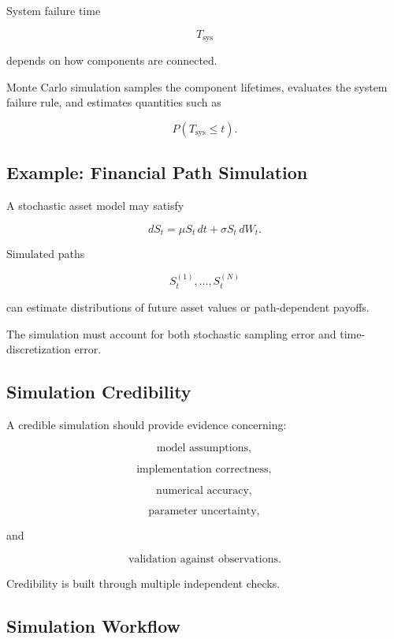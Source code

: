 System failure time

\[
T_{\mathrm{sys}}
\]

depends on how components are connected.

Monte Carlo simulation samples the component lifetimes, evaluates the
system failure rule, and estimates quantities such as

\[
\boxed{
P(T_{\mathrm{sys}}\leq t).
}
\]

\subsection{Example: Financial Path Simulation}
\label{subsec:financial-path-simulation}

A stochastic asset model may satisfy

\[
\boxed{
dS_t
=
\mu S_t\,dt
+
\sigma S_t\,dW_t.
}
\]

Simulated paths

\[
S_t^{(1)},
\ldots,
S_t^{(N)}
\]

can estimate distributions of future asset values or path-dependent
payoffs.

The simulation must account for both stochastic sampling error and
time-discretization error.

\subsection{Simulation Credibility}
\label{subsec:simulation-credibility}

A credible simulation should provide evidence concerning:

\[
\boxed{
\text{model assumptions},
}
\]

\[
\boxed{
\text{implementation correctness},
}
\]

\[
\boxed{
\text{numerical accuracy},
}
\]

\[
\boxed{
\text{parameter uncertainty},
}
\]

and

\[
\boxed{
\text{validation against observations}.
}
\]

Credibility is built through multiple independent checks.

\subsection{Simulation Workflow}
\label{subsec:mathematical-simulation-workflow}

